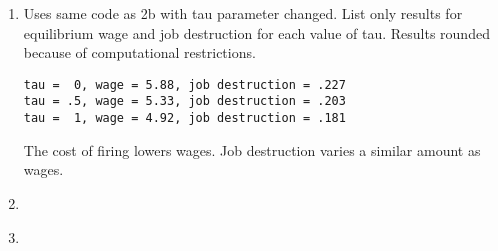 \documentclass[12pt]{article}
\begin{document}
\begin{onehalfspace}
\begin{enumerate}[1.]
    
    \item Uses same code as 2b with tau parameter changed. List only results for equilibrium wage and job destruction for each value of tau. Results rounded because of computational restrictions.
\begin{lstlisting}
tau =  0, wage = 5.88, job destruction = .227
tau = .5, wage = 5.33, job destruction = .203
tau =  1, wage = 4.92, job destruction = .181
\end{lstlisting}
The cost of firing lowers wages. Job destruction varies a similar amount as wages.
    \item
\begin{lstlisting}
\end{lstlisting}
    \item
\begin{lstlisting}
\end{lstlisting}
\end{enumerate}

\end{onehalfspace}
\end{document}
